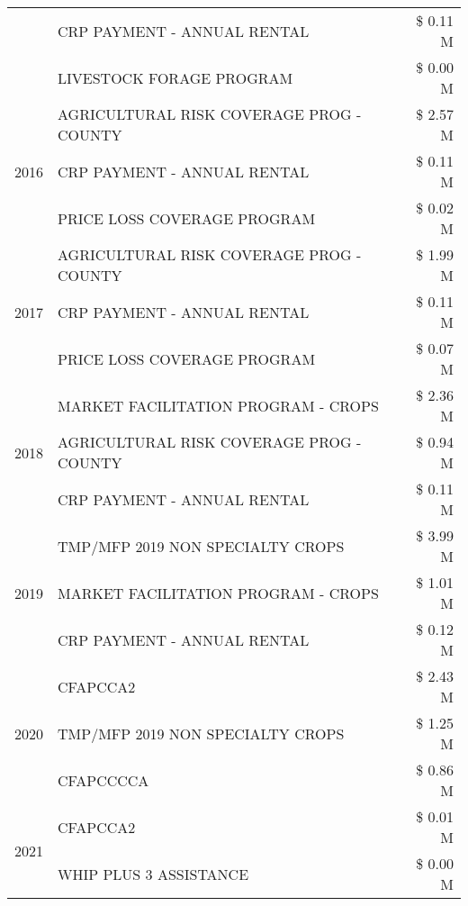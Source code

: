 \begin{tabular}{llr}
 & CRP PAYMENT - ANNUAL RENTAL & \$ 0.11 M \\
 & LIVESTOCK FORAGE PROGRAM & \$ 0.00 M \\
\cline{1-3}
\multirow[t]{3}{*}{2016} & AGRICULTURAL RISK COVERAGE PROG - COUNTY & \$ 2.57 M \\
 & CRP PAYMENT - ANNUAL RENTAL & \$ 0.11 M \\
 & PRICE LOSS COVERAGE PROGRAM & \$ 0.02 M \\
\cline{1-3}
\multirow[t]{3}{*}{2017} & AGRICULTURAL RISK COVERAGE PROG - COUNTY & \$ 1.99 M \\
 & CRP PAYMENT - ANNUAL RENTAL & \$ 0.11 M \\
 & PRICE LOSS COVERAGE PROGRAM & \$ 0.07 M \\
\cline{1-3}
\multirow[t]{3}{*}{2018} & MARKET FACILITATION PROGRAM - CROPS & \$ 2.36 M \\
 & AGRICULTURAL RISK COVERAGE PROG - COUNTY & \$ 0.94 M \\
 & CRP PAYMENT - ANNUAL RENTAL & \$ 0.11 M \\
\cline{1-3}
\multirow[t]{3}{*}{2019} & TMP/MFP 2019 NON SPECIALTY CROPS & \$ 3.99 M \\
 & MARKET FACILITATION PROGRAM - CROPS & \$ 1.01 M \\
 & CRP PAYMENT - ANNUAL RENTAL & \$ 0.12 M \\
\cline{1-3}
\multirow[t]{3}{*}{2020} & CFAPCCA2 & \$ 2.43 M \\
 & TMP/MFP 2019 NON SPECIALTY CROPS & \$ 1.25 M \\
 & CFAPCCCCA & \$ 0.86 M \\
\cline{1-3}
\multirow[t]{2}{*}{2021} & CFAPCCA2 & \$ 0.01 M \\
 & WHIP PLUS 3 ASSISTANCE & \$ 0.00 M \\
\cline{1-3}
\bottomrule
\end{tabular}
